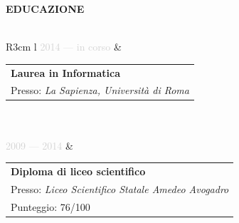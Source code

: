 \documentclass{article}
\begin{document}
\textbf{\textcolor{deepblue}{EDUCAZIONE}} \\\\ \hfill
\begin{tabular}{ R{3cm} l }
	\textcolor{lightgray}{2014 — in corso} & \begin{tabular}[l]{@{}l@{}}
	\textbf{Laurea in Informatica} \\
	Presso: \textit{La Sapienza, Universit\`a di Roma} \\
\end{tabular} \\\\ \hfill
\textcolor{lightgray}{2009 — 2014}  & \begin{tabular}[l]{@{}l@{}}
\textbf{Diploma di liceo scientifico} \\
Presso: \textit{Liceo Scientifico Statale Amedeo Avogadro} \\
Punteggio: 76/100
\end{tabular} \\\\ \hfill
\end{tabular}

\newpage
\end{document}
